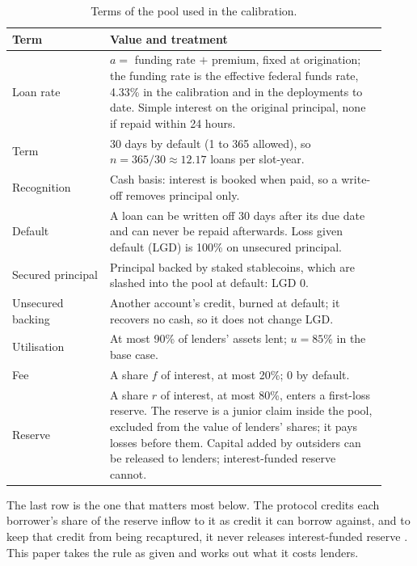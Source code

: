 \documentclass[11pt]{article}
\theoremstyle{plain}
\theoremstyle{definition}
\begin{document}
\begin{table}[ht]
  \centering\small
  \caption{Terms of the pool used in the calibration.}
  \label{tab:pool}
  \begin{tabular}{p{0.24\linewidth}p{0.68\linewidth}}
    \toprule
    Term & Value and treatment \\
    \midrule
    Loan rate & $a=$ funding rate $+$ premium, fixed at origination; the funding rate is the
      effective federal funds rate, 4.33\% in the calibration and in the deployments to date. Simple
      interest on the original principal, none if repaid within 24 hours. \\
    Term & 30 days by default (1 to 365 allowed), so $n=365/30\approx12.17$ loans per slot-year. \\
    Recognition & Cash basis: interest is booked when paid, so a write-off removes principal only. \\
    Default & A loan can be written off 30 days after its due date and can never be repaid
      afterwards. Loss given default (LGD) is 100\% on unsecured principal. \\
    Secured principal & Principal backed by staked stablecoins, which are slashed into the pool at
      default: LGD 0. \\
    Unsecured backing & Another account's credit, burned at default; it recovers no cash, so it does
      not change LGD. \\
    Utilisation & At most 90\% of lenders' assets lent; $u=85\%$ in the base case. \\
    Fee & A share $f$ of interest, at most 20\%; 0 by default. \\
    Reserve & A share $r$ of interest, at most 80\%, enters a first-loss reserve. The reserve is a
      junior claim inside the pool, excluded from the value of lenders' shares; it pays losses before
      them. Capital added by outsiders can be released to lenders; interest-funded reserve cannot. \\
    \bottomrule
  \end{tabular}
\end{table}

The last row is the one that matters most below. The protocol credits each borrower's share of the
reserve inflow to it as credit it can borrow against, and to keep that credit from being recaptured,
it never releases interest-funded reserve \citep{conservedcredit2026}. This paper takes the rule as
given and works out what it costs lenders.
\end{document}
